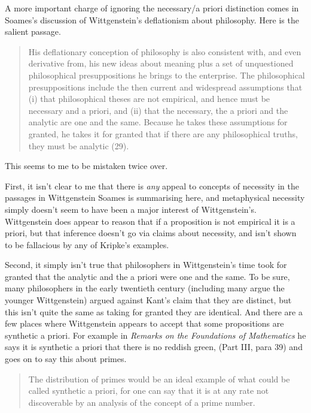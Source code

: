 A more important charge of ignoring the necessary\slash a priori distinction comes in Soames's discussion of Wittgenstein's deflationism about philosophy. Here is the salient passage.

\begin{quote}
His deflationary conception of philosophy is also consistent with, and even derivative from, his new ideas about meaning plus a set of unquestioned philosophical presuppositions he brings to the enterprise. The philosophical presuppositions include the then current and widespread assumptions that (i) that philosophical theses are not empirical, and hence must be necessary and a priori, and (ii) that the necessary, the a priori and the analytic are one and the same. Because he takes these assumptions for granted, he takes it for granted that if there are any philosophical truths, they must be analytic (29).
\end{quote}

\noindent This seems to me to be mistaken twice over.

First, it isn't clear to me that there is \textit{any} appeal to concepts of necessity in the passages in Wittgenstein Soames is summarising here, and metaphysical necessity simply doesn't seem to have been a major interest of Wittgenstein's. Wittgenstein does appear to reason that if a proposition is not empirical it is a priori, but that inference doesn't go via claims about necessity, and isn't shown to be fallacious by any of Kripke's examples.

Second, it simply isn't true that philosophers in Wittgenstein's time took for granted that the analytic and the a priori were one and the same. To be sure, many philosophers in the early twentieth century (including many argue the younger Wittgenstein) argued against Kant's claim that they are distinct, but this isn't quite the same as taking for granted they are identical. And there are a few places where Wittgenstein appears to accept that some propositions are synthetic a priori. For example in \textit{Remarks on the Foundations of Mathematics} he says it is synthetic a priori that there is no reddish green, (Part III, para 39) and goes on to say this about primes.

\begin{quote}
The distribution of primes would be an ideal example of what could be called synthetic a priori, for one can say that it is at any rate not discoverable by an analysis of the concept of a prime number. \cite[Part III, para 42]{Wittgenstein1956} 
\end{quote}

